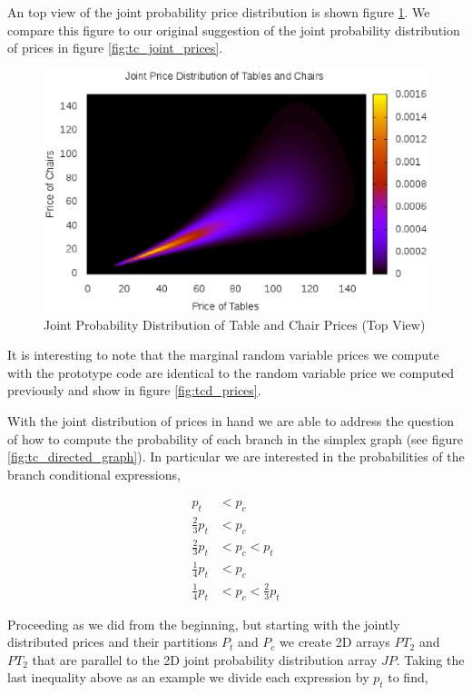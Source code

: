 An top view of the joint probability price distribution is
shown figure \ref{fig:Ptc_flat}. We compare this figure to our
original suggestion of the joint probability distribution of prices in
figure \ref{fig:tc_joint_prices}. 

\begin{figure}
  \centering
  \includegraphics[width=120mm]{Images/Ptc_flat.eps}
  \caption[Joint Probability Distribution of Table and Chair Prices (Top View)]
          {Joint Probability Distribution of Table and Chair Prices (Top View)}
  \label{fig:Ptc_flat}
\end{figure}

It is interesting to note that the marginal random variable prices we
compute with the prototype code are identical to the random variable
price we computed previously and show in figure \ref{fig:tcd_prices}.

With the joint distribution of prices in hand we are able to address
the question of how to compute the probability of each branch in the
simplex graph (see figure \ref{fig:tc_directed_graph}). In particular
we are interested in the probabilities of the branch conditional
expressions,

\begin{align*}
p_t &< p_c\\
\frac{2}{3}p_t &< p_c\\
\frac{2}{3}p_t &< p_c < p_t\\
\frac{1}{4}p_t &< p_c\\
\frac{1}{4}p_t &< p_c < \frac{2}{3}p_t
\end{align*}

Proceeding as we did from the beginning, but starting with the jointly
distributed prices and their partitions $P_t$ and $P_c$ we create 2D
arrays $PT_2$ and $PT_2$ that are parallel to the 2D joint probability
distribution array $JP$. Taking the last inequality above as an
example we divide each expression by $p_t$ to find,

